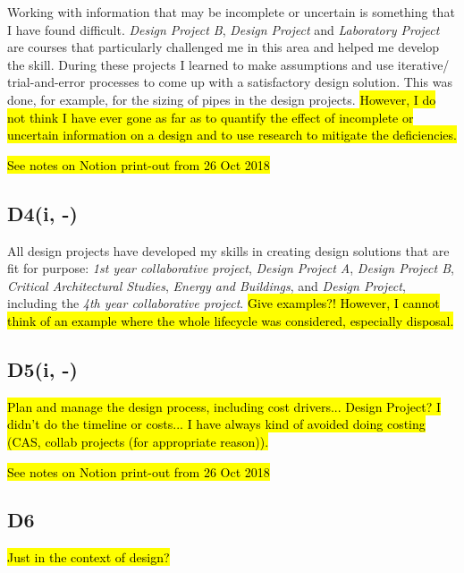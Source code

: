 Working with information that may be incomplete or uncertain is something that I have found difficult.
\textit{Design Project B}, \textit{Design Project} and \textit{Laboratory Project} are courses that particularly challenged me in this area and helped me develop the skill.
During these projects I learned to make assumptions and use iterative/ trial-and-error processes to come up with a satisfactory design solution.
This was done, for example, for the sizing of pipes in the design projects.
\hl{However, I do not think I have ever gone as far as to quantify the effect of incomplete or uncertain information on a design and to use research to mitigate the deficiencies.}

\hl{See notes on Notion print-out from 26 Oct 2018}


\subsection*{D4(i, -)}

All design projects have developed my skills in creating design solutions that are fit for purpose:
\textit{1st year collaborative project},
\textit{Design Project A},
\textit{Design Project B},
\textit{Critical Architectural Studies},
\textit{Energy and Buildings},
and \textit{Design Project}, including the \textit{4th year collaborative project}.
\hl{Give examples?!
However, I cannot think of an example where the whole lifecycle was considered, especially disposal.}


\subsection*{D5(i, -)}

\hl{Plan and manage the design process, including cost drivers...
Design Project? I didn't do the timeline or costs...
I have always kind of avoided doing costing (CAS, collab projects (for appropriate reason)).}

\hl{See notes on Notion print-out from 26 Oct 2018}


\subsection*{D6}

\hl{Just in the context of design?}

